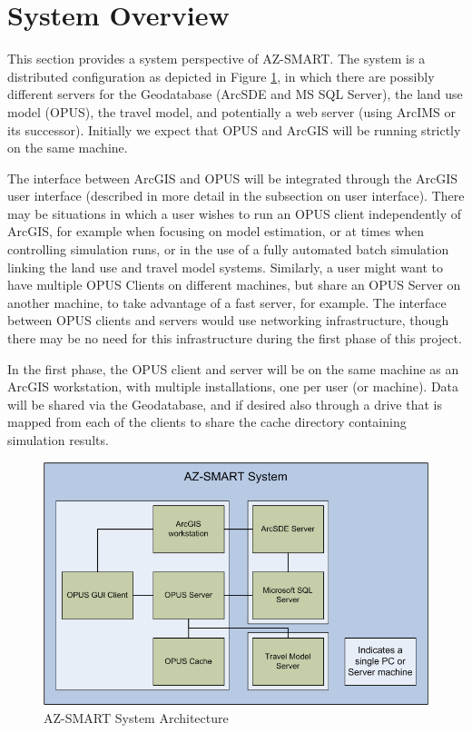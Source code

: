 \section{System Overview}
This section provides a system perspective of AZ-SMART.  The system is a distributed configuration as depicted in Figure \ref{figSystem},
in which there are possibly different servers for the Geodatabase (ArcSDE and MS SQL Server), the land use model (OPUS), the travel model,
and potentially a web server (using ArcIMS or its successor).  Initially we expect that OPUS and ArcGIS will be running strictly on the
same machine.

The interface between ArcGIS and OPUS will be integrated through the ArcGIS user interface (described in more detail in the subsection on
user interface).  There may be situations in which a user wishes to run an OPUS client independently of ArcGIS, for example when focusing
on model estimation, or at times when controlling simulation runs, or in the use of a fully automated batch simulation linking the land
use and travel model systems.  Similarly, a user might want to have multiple OPUS Clients on different machines, but share an OPUS Server
on another machine, to take advantage of a fast server, for example.  The interface between OPUS clients and servers would use networking
infrastructure, though there may be no need for this infrastructure during the first phase of this project.

In the first phase, the OPUS client and server will be on the same machine as an ArcGIS workstation, with multiple installations, one
per user (or machine).  Data will be shared via the Geodatabase, and if desired also through a drive that is mapped from each of the
clients to share the cache directory containing simulation results.

\begin{figure}[h]
\begin{center}
\includegraphics[scale=0.6]{figures/AZ-SMART_system_diagram.png}
\caption{AZ-SMART System Architecture}
\label{figSystem}
\end{center}
\end{figure}

